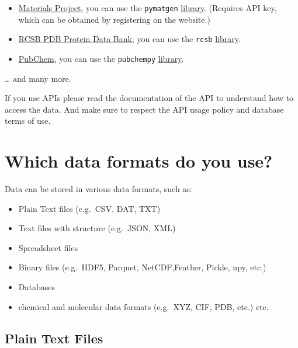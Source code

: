 \documentclass[
  letterpaper,
  DIV=11,
  numbers=noendperiod]{scrreprt}
\providecommand{\tightlist}{%
  \setlength{\itemsep}{0pt}\setlength{\parskip}{0pt}}\usepackage{longtable,booktabs,array}
\begin{document}
\begin{itemize}
\item
  \href{https://next-gen.materialsproject.org/api}{Materials Project},
  you can use the \texttt{pymatgen}
  \href{https://pymatgen.org/}{library}. (Requires API key, which can be
  obtained by registering on the website.)
\item
  \href{https://www.rcsb.org/docs/programmatic-access/web-apis-overview}{RCSB
  PDB Protein Data Bank}, you can use the \texttt{rcsb}
  \href{https://rcsbapi.readthedocs.io/en/latest/}{library}.
\item
  \href{https://pubchem.ncbi.nlm.nih.gov/docs/programmatic-access}{PubChem},
  you can use the \texttt{pubchempy}
  \href{https://pubchempy.readthedocs.io/en/latest/guide/introduction.html}{library}.
\end{itemize}

\ldots{} and many more.

If you use APIs please read the documentation of the API to understand
how to access the data. And make sure to respect the API usage policy
and database terms of use.

\section*{Which data formats do you
use?}\label{which-data-formats-do-you-use}


Data can be stored in various data formats, such as:

\begin{itemize}
\tightlist
\item
  Plain Text files (e.g.~CSV, DAT, TXT)
\item
  Text files with structure (e.g.~JSON, XML)
\item
  Spreadsheet files
\item
  Binary files (e.g.~HDF5, Parquet, NetCDF,Feather, Pickle, npy, etc.)
\item
  Databases
\item
  chemical and molecular data formats (e.g.~XYZ, CIF, PDB, etc.) etc.
\end{itemize}

\subsection*{Plain Text Files}\label{plain-text-files}
\end{document}
